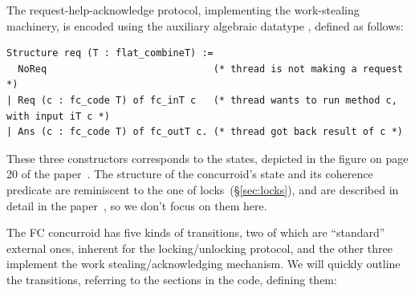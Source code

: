 The request-help-acknowledge protocol, implementing the work-stealing
machinery, is encoded using the auxiliary algebraic datatype
, defined as follows:

\begin{lstlisting}
Structure req (T : flat_combineT) := 
  NoReq                             (* thread is not making a request *)
| Req (c : fc_code T) of fc_inT c   (* thread wants to run method c, with input iT c *)
| Ans (c : fc_code T) of fc_outT c. (* thread got back result of c *)  
\end{lstlisting}

These three constructors corresponds to the states, depicted in the
figure on page 20 of the paper~\cite{Sergey-al:ESOP15}. The structure
of the concurroid's state and its coherence predicate are reminiscent
to the one of locks~(\S\ref{sec:locks}), and are described in detail
in the paper~\cite{Sergey-al:ESOP15}, so we don't focus on them here.

The FC concurroid has five kinds of transitions, two of which are
``standard'' external ones, inherent for the locking/unlocking
protocol, and the other three implement the work
stealing/acknowledging mechanism. We will quickly outline the
transitions, referring to the sections in the code, defining them:

